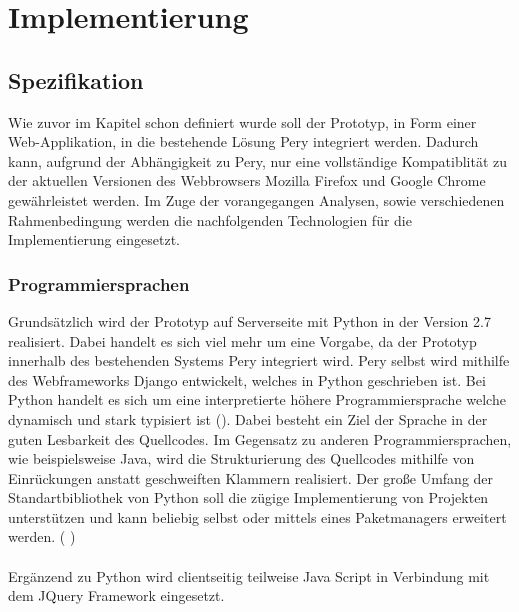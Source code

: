 \documentclass[Bachelorarbeit.tex]{subfiles}
\begin{document}
\chapter{Implementierung}
\label{chap:implementierung}

\section{Spezifikation}
\label{chap:implementierung:sec:spezifikation}
Wie zuvor im Kapitel  schon definiert wurde soll der Prototyp, in Form einer Web-Applikation, in die bestehende Lösung Pery integriert werden.
Dadurch kann, aufgrund der Abhängigkeit zu Pery, nur eine vollständige Kompatiblität zu der aktuellen Versionen des Webbrowsers Mozilla Firefox und Google Chrome gewährleistet werden.   
Im Zuge der vorangegangen Analysen, sowie verschiedenen Rahmenbedingung werden die nachfolgenden Technologien für die Implementierung eingesetzt. 

\subsection*{Programmiersprachen}
Grundsätzlich wird der Prototyp auf Serverseite mit Python in der Version 2.7 realisiert. 
Dabei handelt es sich viel mehr um eine Vorgabe, da der Prototyp innerhalb des bestehenden Systems Pery integriert wird. Pery selbst wird mithilfe des Webframeworks Django entwickelt, welches in Python geschrieben ist.
Bei Python handelt es sich um eine interpretierte höhere Programmiersprache welche dynamisch und stark typisiert ist (\cite[vgl.][]{PythonTyped}).
Dabei besteht ein Ziel der Sprache in der guten Lesbarkeit des Quellcodes. 
Im Gegensatz zu anderen Programmiersprachen, wie beispielsweise Java, wird die Strukturierung des Quellcodes mithilfe von Einrückungen anstatt geschweiften Klammern realisiert.
Der große Umfang der Standartbibliothek von Python soll die zügige Implementierung von Projekten unterstützen und kann beliebig selbst oder mittels eines Paketmanagers erweitert werden. (\cite[vgl.][]{PythonDoc} \cite[sowie ][- sekundär Quelle]{PythonStackoverflow})\\
\\
Ergänzend zu Python wird clientseitig teilweise Java Script in Verbindung mit dem JQuery Framework eingesetzt. 
\end{document}
